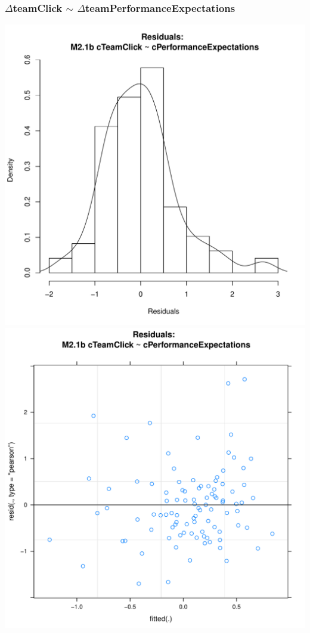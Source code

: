 \documentclass[12pt]{report}
\begin{document}
\subsubsection{$\Delta$teamClick $\sim$ $\Delta$teamPerformanceExpectations}

\newpage
\centering


\newpage
\centering


\centering
\newpage
\includegraphics[scale =.4]{../images/MLM21bHist.pdf}
\includegraphics[scale =.4]{../images/MLM21bScatter.pdf}
\end{document}
